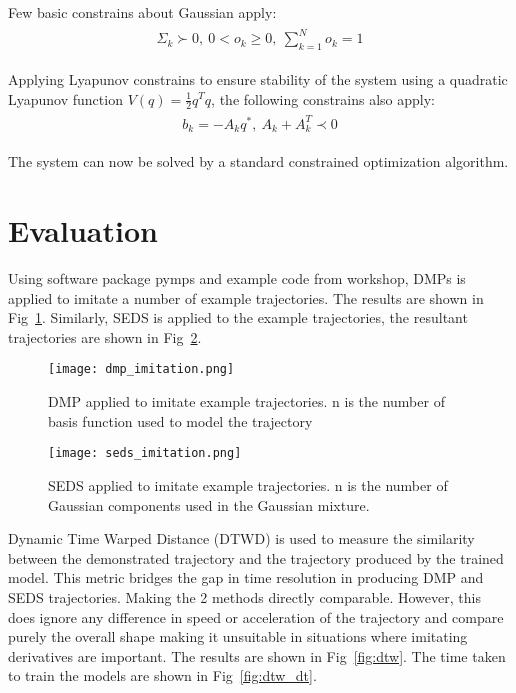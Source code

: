 \documentclass[conference]{IEEEtran}
\begin{document}
Few basic constrains about Gaussian apply:
\begin{align}
\begin{split}
    \Sigma_k \succ 0,\ 0 < o_k \geq 0,\ \sum_{k=1}^N o_k = 1
\end{split}
\end{align}

Applying Lyapunov constrains to ensure stability of the system using a quadratic Lyapunov function $V(q) = \frac{1}{2}q^Tq$, the following constrains also apply:
\begin{align}
    \begin{split}
        b_k=-A_kq^*,\ A_k + A_k^T \prec 0
    \end{split}
\end{align}

The system can now be solved by a standard constrained optimization algorithm.

\section{Evaluation}

Using software package pymps \cite{dewolfStudywolfPydmps2024} and example code from workshop, DMPs is applied to imitate a number of example trajectories. The results are shown in Fig~\ref{fig:dmp}. Similarly, SEDS is applied to the example trajectories, the resultant trajectories are shown in Fig~\ref{fig:seds}.

\begin{figure}
    \centering
    \texttt{[image: dmp\_imitation.png]}
    \caption{DMP applied to imitate example trajectories. n is the number of basis function used to model the trajectory}
    \label{fig:dmp}
\end{figure}

\begin{figure}
    \centering
    \texttt{[image: seds\_imitation.png]}
    \caption{SEDS applied to imitate example trajectories. n is the number of Gaussian components used in the Gaussian mixture.}
    \label{fig:seds}
\end{figure}

Dynamic Time Warped Distance \cite{salvadorAccurateDynamicTime2007c} (DTWD) is used to measure the similarity between the demonstrated trajectory and the trajectory produced by the trained model. This metric bridges the gap in time resolution in producing DMP and SEDS trajectories. Making the 2 methods directly comparable. However, this does ignore any difference in speed or acceleration of the trajectory and compare purely the overall shape making it unsuitable in situations where imitating derivatives are important. The results are shown in Fig~\ref{fig:dtw}. The time taken to train the models are shown in Fig~\ref{fig:dtw_dt}.
\end{document}
